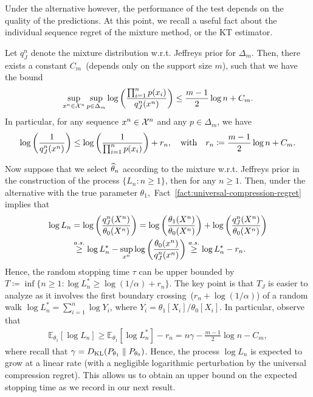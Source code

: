 \documentclass[12pt]{article}
\begin{document}
Under the alternative however, the performance of the test depends on the quality of the predictions. At this point, we recall a useful fact about the individual sequence regret of the mixture method, or the KT estimator. 
\begin{fact}
    \label{fact:universal-compression-regret} 
    Let $q_J^n$ denote the mixture distribution w.r.t. Jeffreys prior for $\Delta_m$. Then, 
    there exists a constant $C_m$~(depends only on the support size $m$), such that we have the bound 
    \begin{align}
        \sup_{x^n \in {\cal X}^n} \sup_{p \in \Delta_m} \log \left( \frac{\prod_{i=1}^n p(x_i)}{q_J^n(x^n)} \right) \leq \frac{m-1}{2} \log n + C_m. 
    \end{align}
    In particular, for any sequence $x^n \in {\cal X}^n$ and any $p \in \Delta_m$, we have 
    \begin{align}
        \log\left( \frac 1 {q^n_J(x^n)} \right) \leq \log \left( \frac 1 {\prod_{i=1}^n p(x_i)} \right) + r_n, \quad \text{with} \quad r_n \coloneqq \frac{ m-1}{2} \log n + C_m.
    \end{align}
\end{fact}
Now suppose that we select $\widehat{\theta}_n$ according to the mixture w.r.t. Jeffreys prior in the construction of the process $\{L_n: n \geq 1\}$, then for any $n \geq 1$. Then, under the alternative with the true parameter $\theta_1$,~Fact~\ref{fact:universal-compression-regret} implies that 
\begin{align}
    \log L_n &= \log \left( \frac{q_J^n(X^n)}{\theta_0(X^n)} \right) = \log \left( \frac{\theta_1(X^n)}{\theta_0(X^n)} \right) + \log \left( \frac{q_J^n(X^n)}{\theta_0(X^n)} \right) \\
    &\stackrel{a.s.}{\geq} \log L^*_n - \sup_{x^n}\log\left( \frac{\theta_0(x^n)}{q_J^n(x^n)} \right)  \stackrel{a.s.}{\geq} \log L^*_n -  r_n. 
\end{align}
Hence, the random stopping time $\tau$ can be upper bounded by $T \coloneqq \inf \{n \geq 1: \log L^*_n \geq \log(1/\alpha) + r_n\}$. The key point is that $T_J$ is easier to analyze as it involves the first boundary crossing~($r_n + \log(1/\alpha)$) of a random walk $\log L^*_n = \sum_{i=1}^n \log Y_i$, where $Y_i = \theta_1[X_i]/\theta_0[X_i]$. In particular, observe that 
\begin{align}
    \mathbb{E}_{\theta_1}[\log L_n] \geq \mathbb{E}_{\theta_1}[\log L_n^*] - r_n = n \gamma - \frac{m-1}{2}\log n - C_m,\label{eq:redundancy-likelihood-func}
\end{align}
where recall that $\gamma = D_{\text{KL}}(P_{\theta_1} \parallel P_{\theta_0})$. Hence, the process $\log L_n$ is expected to grow at a linear rate (with a negligible logarithmic perturbation by the universal compression regret).  This allows us to obtain an upper bound on the expected stopping time as we record in our next result. 
\end{document}
